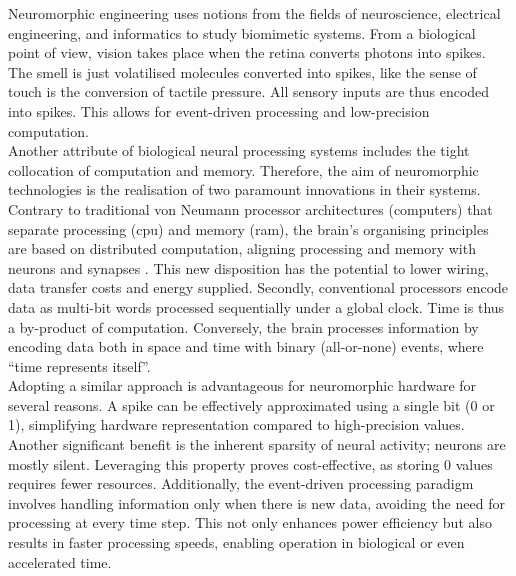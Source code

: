 Neuromorphic engineering uses notions from the fields of neuroscience,
electrical engineering, and informatics to study biomimetic systems. From a
biological point of view, vision takes place when the retina converts 
photons into spikes. The smell is just volatilised molecules converted into
spikes, like the sense of touch is the conversion of tactile pressure. All
sensory inputs are thus encoded into spikes. This allows for event-driven
processing and low-precision computation.\\
Another attribute of biological neural processing systems includes the 
tight collocation of computation and memory. Therefore, the aim of 
neuromorphic technologies is the realisation of two paramount innovations 
in their systems. Contrary to traditional von Neumann processor 
architectures (computers) that separate processing (\acrfull{cpu}) and memory (\acrshort{ram}), 
the brain’s organising principles are based on distributed computation, 
aligning processing and memory with neurons and synapses 
\cite{IndiveriLiu}. This new disposition has the potential to lower wiring, 
data transfer costs and energy supplied. 
Secondly, conventional processors encode data as multi-bit words 
processed sequentially under a global clock. Time is thus a 
by-product of computation. Conversely, the brain processes 
information by encoding data both in space and time with 
binary (all-or-none) events, where \enquote{time represents itself}.\\

Adopting a similar approach is advantageous for neuromorphic hardware for 
several reasons. A spike can be effectively approximated using a single 
bit (0 or 1), simplifying hardware representation compared to high-precision 
values. Another significant benefit is the inherent sparsity of 
neural activity; neurons are mostly silent. Leveraging this property proves
cost-effective, as storing 0 values requires fewer resources. Additionally,
the event-driven processing paradigm involves handling information only
when there is new data, avoiding the need for processing at every time 
step. This not only enhances power efficiency but also results in faster 
processing speeds, enabling operation in biological or even accelerated 
time.\\

